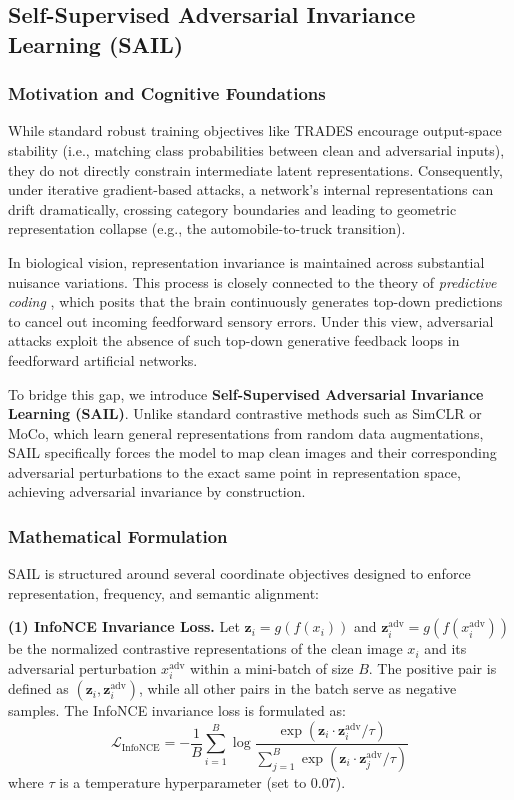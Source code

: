 \documentclass[12pt,a4paper]{article}
\begin{document}
\subsection{Self-Supervised Adversarial Invariance Learning (SAIL)}
\label{sec:sail}

\subsubsection{Motivation and Cognitive Foundations}
While standard robust training objectives like TRADES \citep{zhang2019theoretically} encourage output-space stability (i.e., matching class probabilities between clean and adversarial inputs), they do not directly constrain intermediate latent representations. Consequently, under iterative gradient-based attacks, a network's internal representations can drift dramatically, crossing category boundaries and leading to geometric representation collapse (e.g., the automobile-to-truck transition). 

In biological vision, representation invariance is maintained across substantial nuisance variations. This process is closely connected to the theory of \textit{predictive coding} \citep{rao1999predictive}, which posits that the brain continuously generates top-down predictions to cancel out incoming feedforward sensory errors. Under this view, adversarial attacks exploit the absence of such top-down generative feedback loops in feedforward artificial networks. 

To bridge this gap, we introduce \textbf{Self-Supervised Adversarial Invariance Learning (SAIL)}. Unlike standard contrastive methods such as SimCLR \citep{chen2020simclr} or MoCo, which learn general representations from random data augmentations, SAIL specifically forces the model to map clean images and their corresponding adversarial perturbations to the exact same point in representation space, achieving adversarial invariance by construction.

\subsubsection{Mathematical Formulation}
SAIL is structured around several coordinate objectives designed to enforce representation, frequency, and semantic alignment:

\textbf{(1) InfoNCE Invariance Loss.} Let $\mathbf{z}_i = g(f(x_i))$ and $\mathbf{z}_i^{\text{adv}} = g(f(x_i^{\text{adv}}))$ be the normalized contrastive representations of the clean image $x_i$ and its adversarial perturbation $x_i^{\text{adv}}$ within a mini-batch of size $B$. The positive pair is defined as $(\mathbf{z}_i, \mathbf{z}_i^{\text{adv}})$, while all other pairs in the batch serve as negative samples. The InfoNCE invariance loss is formulated as:
\begin{equation}
\mathcal{L}_{\text{InfoNCE}} = -\frac{1}{B} \sum_{i=1}^{B} \log \frac{\exp(\mathbf{z}_i \cdot \mathbf{z}_i^{\text{adv}} / \tau)}{\sum_{j=1}^{B} \exp(\mathbf{z}_i \cdot \mathbf{z}_j^{\text{adv}} / \tau)}
\label{eq:infonce}
\end{equation}
where $\tau$ is a temperature hyperparameter (set to $0.07$).
\end{document}
